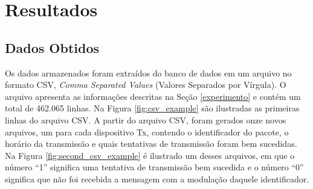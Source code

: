\chapter{Resultados}
\label{resultados}

\section{Dados Obtidos}
Os dados armazenados foram extraídos do banco de dados em um arquivo no formato CSV, \emph{Comma Separated Values} (Valores Separados por Vírgula). O arquivo apresenta as informações descritas na Seção \ref{experimento} e contém um total de 462.065 linhas. Na Figura \ref{fig:csv_example} são ilustradas as primeiras linhas do arquivo CSV. A partir do arquivo CSV, foram gerados onze novos arquivos, um para cada dispositivo Tx, contendo o identificador do pacote, o horário da transmissão e quais tentativas de transmissão foram bem sucedidas. Na Figura \ref{fig:second_csv_example} é ilustrado um desses arquivos, em que o número ``1'' significa uma tentativa de transmissão bem sucedida e o número ``0'' significa que não foi recebida a mensagem com a modulação daquele identificador.


